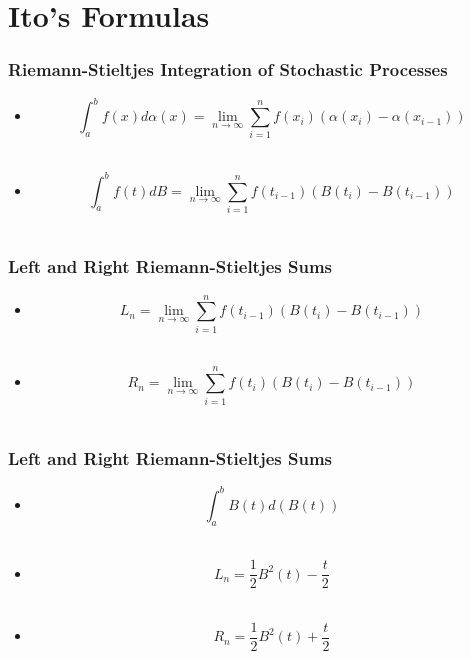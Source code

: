 \section{Ito's Formulas}

%
%

\begin{frame}
  \frametitle{Riemann-Stieltjes Integration of Stochastic Processes}
  \begin{itemize}
  \item $$\int_{a}^{b} f(x) d\alpha(x)=\lim_{n\to\infty}\sum_{i=1}^{n} f(x_i) (\alpha(x_i)-\alpha(x_{i-1}))$$\\
  \item  $$\int_{a}^{b} f(t) dB=\lim_{n\to\infty}\sum_{i=1}^{n} f(t_{i-1}) (B(t_i)-B(t_{i-1}))$$\\
  \end{itemize}
\end{frame}


\begin{frame}
  \frametitle{Left and Right Riemann-Stieltjes Sums}
  \begin{itemize}
  \item $$L_n=\lim_{n\to\infty}\sum_{i=1}^{n} f(t_{i-1}) (B(t_i)-B(t_{i-1}))$$\\
  \item  $$R_n=\lim_{n\to\infty}\sum_{i=1}^{n} f(t_i) (B(t_i)-B(t_{i-1}))$$\\

  \end{itemize}
\end{frame}
  
\begin{frame}
  \frametitle{Left and Right Riemann-Stieltjes Sums}
  \begin{itemize}
      \item  $$\int_{a}^{b}{B(t)d(B(t))}$$\\
  \item $$L_n=\frac{1}{2}B^2(t)-\frac{t}{2}$$\\
  \item $$R_n=\frac{1}{2}B^2(t)+\frac{t}{2}$$\\
  \end{itemize}  
\end{frame}
  
